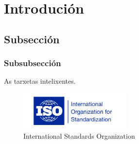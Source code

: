 \section{Introdución}
\subsection{Subsección}
\subsubsection{Subsubsección}
As tarxetas intelixentes.~\cite{web:1}\\

\begin{figure}[h]
	\centering
	\includegraphics[width=0.5\textwidth]{imaxes/iso.png}
	\caption{International Standards Organization}
\end{figure}

